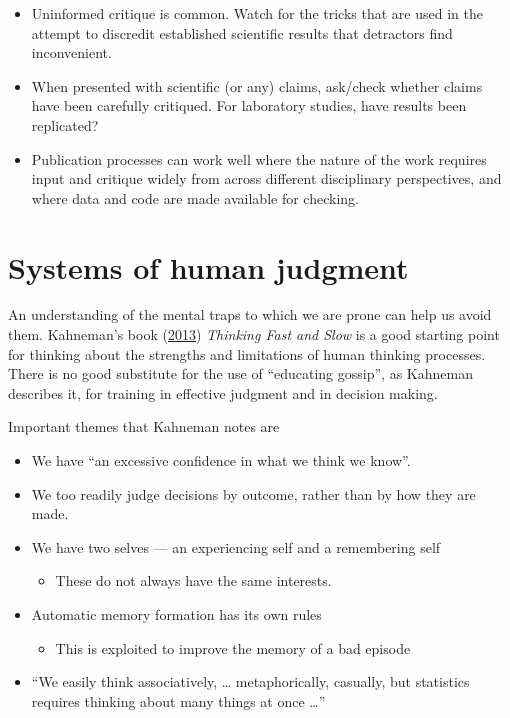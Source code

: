 \documentclass[
  10pt,
  b5paper]{book}
\providecommand{\tightlist}{%
  \setlength{\itemsep}{0pt}\setlength{\parskip}{0pt}}
\begin{document}
\begin{enumerate}
  \begin{itemize}
  \tightlist
  \item
    Uninformed critique is common. Watch for the
    tricks that are used in the attempt to discredit established
    scientific results that detractors find inconvenient.
  \item
    When presented with scientific (or any) claims, ask/check
    whether claims have been carefully critiqued. For laboratory
    studies, have results been replicated?
  \item
    Publication processes can work well where the nature of the
    work requires input and critique widely from across different
    disciplinary perspectives, and where data and code are made
    available for checking.
  \end{itemize}
\end{enumerate}

\mainmatter

\hypertarget{systems-of-human-judgment}{%
\chapter{Systems of human judgment}\label{systems-of-human-judgment}}

An understanding of the mental traps to which we are prone can help us avoid them. Kahneman's book (\protect\hyperlink{ref-kahneman_2013}{2013}) \emph{Thinking Fast and Slow} is a good starting point for thinking about the strengths and limitations of human thinking processes. There is no good substitute
for the use of ``educating gossip'', as Kahneman describes it, for
training in effective judgment and in decision making.

Important themes that Kahneman notes are

\begin{itemize}
\tightlist
\item
  We have ``an excessive confidence in what we think we know''.
\item
  We too readily judge decisions by outcome, rather than by how they are made.
\item
  We have two selves --- an experiencing self and a remembering self

  \begin{itemize}
  \tightlist
  \item
    These do not always have the same interests.
  \end{itemize}
\item
  Automatic memory formation has its own rules

  \begin{itemize}
  \tightlist
  \item
    This is exploited to improve the memory of a bad episode
  \end{itemize}
\item
  ``We easily think associatively, \ldots{} metaphorically, casually, but statistics requires thinking about many things at once \ldots{}''
\end{itemize}
\end{document}
